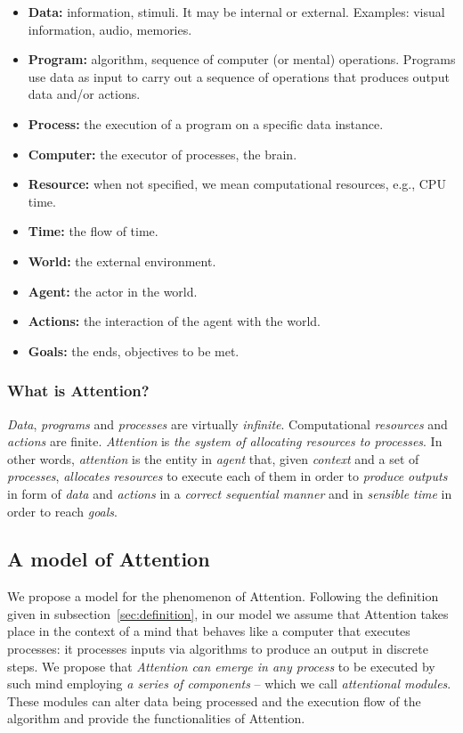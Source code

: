 \documentclass[12pt]{article}
\begin{document}
\begin{itemize}
    \item\textbf{Data:} information, stimuli. It may be internal or external. Examples: visual information, audio, memories.
    \item\textbf{Program:} algorithm, sequence of computer (or mental) operations. Programs use data as input to carry out a sequence of operations that produces output data and/or actions.
    \item\textbf{Process:} the execution of a program on a specific data instance.
    \item\textbf{Computer:} the executor of processes, the brain.
    \item\textbf{Resource:} when not specified, we mean computational resources, e.g., CPU time.
    \item\textbf{Time:} the flow of time.
    \item\textbf{World:} the external environment.
    \item\textbf{Agent:} the actor in the world.
    \item\textbf{Actions:} the interaction of the agent with the world.
    \item\textbf{Goals:} the ends, objectives to be met.
\end{itemize}

\subsubsection{What is Attention?}
\emph{Data}, \emph{programs} and \emph{processes} are virtually \emph{infinite}.
Computational \emph{resources} and \emph{actions} are finite.
\emph{Attention} is \emph{the system of allocating resources to processes}.
In other words, \emph{attention} is the entity in \emph{agent} that, given \emph{context} and a set of \emph{processes},
\emph{allocates} \emph{resources} to execute each of them in order to \emph{produce} \emph{outputs} in form of \emph{data} and \emph{actions} in a \emph{correct sequential manner} and in \emph{sensible time} in order to reach \emph{goals}.

\subsection{A model of Attention}
We propose a model for the phenomenon of Attention.
Following the definition given in subsection~\ref{sec:definition}, in our model we assume that Attention takes place in the context
of a mind that behaves like a computer that executes processes: it processes inputs via algorithms to produce an output in discrete steps.
We propose that \emph{Attention can emerge in any process} to be executed by such mind employing \emph{a series of components} -- which we call \emph{attentional modules}. These modules can alter data being processed and the execution flow of the algorithm and provide the functionalities of Attention.
\end{document}
